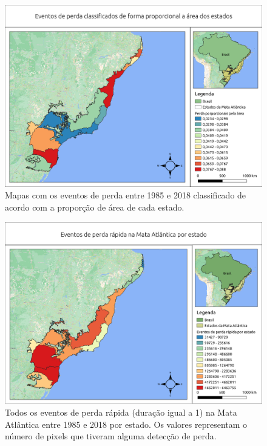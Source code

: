 \begin{figure}[H]
    \centering
    \includegraphics[scale=.5]{images/estado_loss_proporcional.png}
    \caption{Mapas com os eventos de perda entre 1985 e 2018 classificado de acordo com a proporção de área de cada estado.}
    \label{fig:estados_loss_proporcional}
\end{figure}

\begin{figure}[H]
    \centering
    \includegraphics[scale=.5]{images/estados_loss_masked85_maskedGain_eq1.png}
    \caption{Todos os eventos de perda rápida (duração igual a 1) na Mata Atlântica entre 1985 e 2018 por estado. Os valores representam o número de pixels que tiveram alguma detecção de perda.}
    \label{fig:estados_loss_masked85_maskedgain_eq1}
\end{figure}

